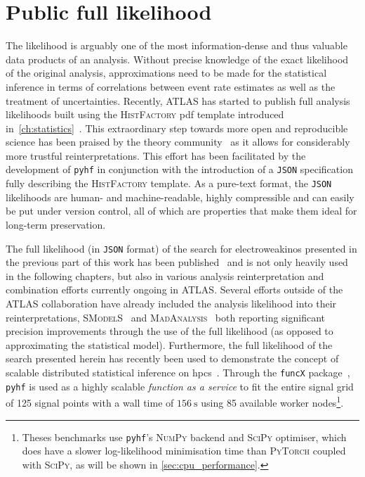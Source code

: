 \section{Public full likelihood}\label{sec:full_likelihood}

The likelihood is arguably one of the most information-dense and thus valuable data products of an analysis. Without precise knowledge of the exact likelihood of the original analysis, approximations need to be made for the statistical inference \eg in terms of correlations between event rate estimates as well as the treatment of uncertainties. Recently, ATLAS has started to publish full analysis likelihoods built using the \textsc{HistFactory} \gls{pdf} template introduced in~\cref{ch:statistics}~\cite{ATL-PHYS-PUB-2019-029}. This extraordinary step towards more open and reproducible science has been praised by the theory community~\cite{REINP:2020pec} as it allows for considerably more trustful reinterpretations. This effort has been facilitated by the development of \texttt{pyhf} in conjunction with the introduction of a \texttt{JSON} specification fully describing the \textsc{HistFactory} template. As a pure-text format, the \texttt{JSON} likelihoods are human- and machine-readable, highly compressible and can easily be put under version control, all of which are properties that make them ideal for long-term preservation. 

The full likelihood (in \texttt{JSON} format) of the search for electroweakinos presented in the previous part of this work has been published~\cite{fullLH_1Lbb} and is not only heavily used in the following chapters, but also in various analysis reinterpretation and combination efforts currently ongoing in ATLAS. Several efforts outside of the ATLAS collaboration have already included the analysis likelihood into their reinterpretations, \eg \textsc{SModelS}~\cite{SModelS_pyhf:2020grj} and \textsc{MadAnalysis}~\cite{Goodsell:2020ddr,Fuks:2021wpe} both reporting significant precision improvements through the use of the full likelihood (as opposed to approximating the statistical model). Furthermore, the full likelihood of the search presented herein has recently been used to demonstrate the concept of scalable distributed statistical inference on \glspl{hpc}~\cite{Feickert:2021sua}. Through the \texttt{funcX} package~\cite{chard20funcx}, \texttt{pyhf} is used as a highly scalable \textit{function as a service} to fit the entire signal grid of 125 signal points with a wall time of $\SI{156}{\second}$ using 85 available worker nodes\footnote{Theses benchmarks use \texttt{pyhf}'s \textsc{NumPy} backend and \textsc{SciPy} optimiser, which does have a slower log-likelihood minimisation time than \eg \textsc{PyTorch} coupled with \textsc{SciPy}, as will be shown in \cref{sec:cpu_performance}.}.

